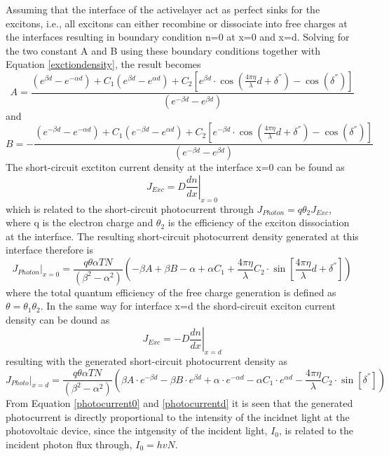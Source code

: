 \documentclass{article}
\begin{document}
Assuming that the interface of the activelayer act as perfect sinks for the
excitons, i.e., all excitons can either recombine or dissociate into free
charges at the interfaces resulting in boundary condition n=0 at x=0 and x=d.
Solving for the two constant A and B using these boundary conditions together
with Equation \ref{exctiondensity}, the result becomes
\begin{equation}
A=\frac{({{e}^{\beta d}}-{{e}^{-\alpha d}})+{{C}_{1}}({{e}^{\beta
d}}-{{e}^{\alpha d}})+{{C}_{2}}\left[ {{e}^{\beta d}}\cdot \cos \left( \frac{4\pi \eta }{\lambda }d+{{\delta }^{''}} \right)-\cos ({{\delta }^{''}}) \right]}{({{e}^{-\beta d}}-{{e}^{\beta d}})}
\end{equation}
and
\begin{equation}
B=-\frac{({{e}^{-\beta d}}-{{e}^{-\alpha d}})+{{C}_{1}}({{e}^{-\beta
d}}-{{e}^{\alpha d}})+{{C}_{2}}\left[ {{e}^{-\beta d}}\cdot \cos \left( \frac{4\pi \eta }{\lambda }d+{{\delta }^{''}} \right)-\cos ({{\delta }^{''}}) \right]}{({{e}^{-\beta d}}-{{e}^{\beta d}})}
\end{equation}
The short-circuit exctiton current density at the interface x=0 can be found as
\begin{equation}
{{J}_{Exc}}={{\left. D\frac{dn}{dx} \right|}_{x=0}}
\end{equation}
which is related to the short-circuit photocurrent through
${{J}_{Photon}}=q{{\theta }_{2}}{{J}_{Exc}}$, where q is the electron charge and
$\theta_2$ is the efficiency of the exciton dissociation at the interface. The
resulting short-circuit photocurrent density generated at this interface
therefore is 
\begin{equation}
{{\left. {{J}_{Photon}} \right|}_{x=0}}=\frac{q\theta \alpha TN}{({{\beta
}^{2}}-{{\alpha }^{2}})}\left( -\beta A+\beta B-\alpha +\alpha {{C}_{1}}+\frac{4\pi \eta }{\lambda }{{C}_{2}}\cdot \sin \left[ \frac{4\pi \eta }{\lambda }d+{{\delta }^{''}} \right] \right)
\label{photocurrent0}
\end{equation}
where the total quantum efficiency of the free charge generation is defined as
$\theta=\theta_1\theta_2$. In the same way for interface x=d the shord-circuit
exciton current density can be dound as 
\begin{equation}
{{J}_{Exc}}=-D{{\left. \frac{dn}{dx} \right|}_{x=d}}
\end{equation}
resulting with the generated short-circuit photocurrent density as 
\begin{equation}
{{\left. {{J}_{Photo}} \right|}_{x=d}}=\frac{q\theta \alpha TN}{({{\beta
}^{2}}-{{\alpha }^{2}})}\left( \beta A\cdot {{e}^{-\beta d}}-\beta B\cdot {{e}^{\beta d}}+\alpha \cdot {{e}^{-\alpha d}}-\alpha {{C}_{1}}\cdot {{e}^{\alpha d}}-\frac{4\pi \eta }{\lambda }{{C}_{2}}\cdot \sin [{{\delta }^{''}}] \right)
\label{photocurrentd}
\end{equation}
From Equation \ref{photocurrent0} and \ref{photocurrentd} it is seen that the
generated photocurrent is directly proportional to the intensity of the incidnet
light at the photovoltaic device, since the intgensity of the incident light,
$I_0$, is related to the incident photon flux through, $I_0=hvN$.
\end{document}
